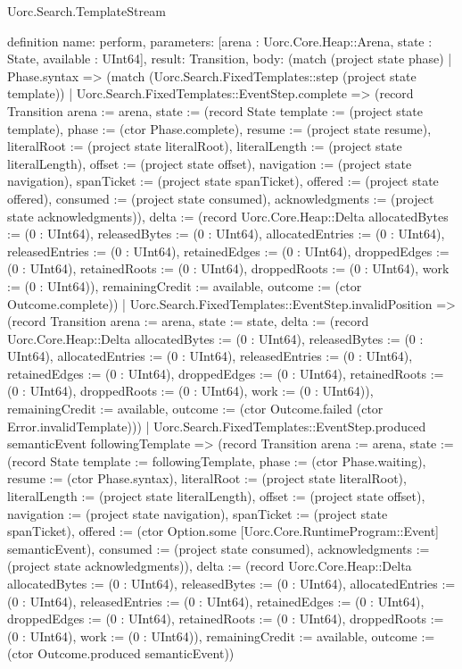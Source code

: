 \begin{lexlean}{Uorc.Search.TemplateStream}
\begin{semanticmodule}
definition{
  name: perform,
  parameters: [arena : Uorc.Core.Heap::Arena, state : State, available : UInt64],
  result: Transition,
  body: (match (project state phase)
    | Phase.syntax => (match (Uorc.Search.FixedTemplates::step (project state template))
      | Uorc.Search.FixedTemplates::EventStep.complete => (record Transition {arena := arena, state := (record State {template := (project state template), phase := (ctor Phase.complete), resume := (project state resume), literalRoot := (project state literalRoot), literalLength := (project state literalLength), offset := (project state offset), navigation := (project state navigation), spanTicket := (project state spanTicket), offered := (project state offered), consumed := (project state consumed), acknowledgments := (project state acknowledgments)}), delta := (record Uorc.Core.Heap::Delta {allocatedBytes := (0 : UInt64), releasedBytes := (0 : UInt64), allocatedEntries := (0 : UInt64), releasedEntries := (0 : UInt64), retainedEdges := (0 : UInt64), droppedEdges := (0 : UInt64), retainedRoots := (0 : UInt64), droppedRoots := (0 : UInt64), work := (0 : UInt64)}), remainingCredit := available, outcome := (ctor Outcome.complete)})
      | Uorc.Search.FixedTemplates::EventStep.invalidPosition => (record Transition {arena := arena, state := state, delta := (record Uorc.Core.Heap::Delta {allocatedBytes := (0 : UInt64), releasedBytes := (0 : UInt64), allocatedEntries := (0 : UInt64), releasedEntries := (0 : UInt64), retainedEdges := (0 : UInt64), droppedEdges := (0 : UInt64), retainedRoots := (0 : UInt64), droppedRoots := (0 : UInt64), work := (0 : UInt64)}), remainingCredit := available, outcome := (ctor Outcome.failed (ctor Error.invalidTemplate))})
      | Uorc.Search.FixedTemplates::EventStep.produced semanticEvent followingTemplate => (record Transition {arena := arena, state := (record State {template := followingTemplate, phase := (ctor Phase.waiting), resume := (ctor Phase.syntax), literalRoot := (project state literalRoot), literalLength := (project state literalLength), offset := (project state offset), navigation := (project state navigation), spanTicket := (project state spanTicket), offered := (ctor Option.some [Uorc.Core.RuntimeProgram::Event] semanticEvent), consumed := (project state consumed), acknowledgments := (project state acknowledgments)}), delta := (record Uorc.Core.Heap::Delta {allocatedBytes := (0 : UInt64), releasedBytes := (0 : UInt64), allocatedEntries := (0 : UInt64), releasedEntries := (0 : UInt64), retainedEdges := (0 : UInt64), droppedEdges := (0 : UInt64), retainedRoots := (0 : UInt64), droppedRoots := (0 : UInt64), work := (0 : UInt64)}), remainingCredit := available, outcome := (ctor Outcome.produced semanticEvent)})
}
\end{semanticmodule}
\end{lexlean}
